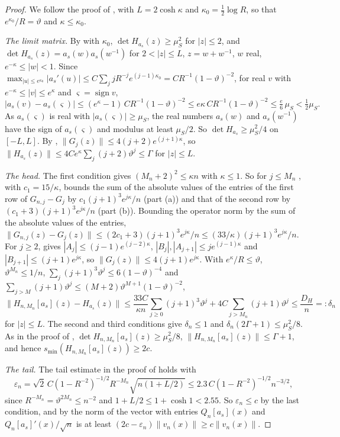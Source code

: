 \documentclass[11pt]{amsart}
\theoremstyle{definition}
\theoremstyle{remark}
\numberwithin{equation}{section}
\newcommand{\eps}{\varepsilon}
\begin{document}
\begin{proof}
We follow the proof of \cite[Proposition~\ref{M-prop:bulk}]{Main}, with $L=2\cosh\kappa$ and $\kappa_0=\frac12\log R$, so that $e^{\kappa_0}/R=\vartheta$ and $\kappa\le\kappa_0$.

\emph{The limit matrix.} By \cite[Lemma~\ref{M-lem:limit}]{Main} with $\kappa_0$, $\det H_{a_s}(z)\ge\mu_S^2$ for $|z|\le2$, and $\det H_{a_s}(z)=a_s(w)a_s(w^{-1})$ for $2<|z|\le L$, $z=w+w^{-1}$, $w$ real, $e^{-\kappa}\le|w|<1$. Since $\max_{|u|\le e^{\kappa_0}}|a_s'(u)|\le C\sum_jjR^{-j}e^{(j-1)\kappa_0}=CR^{-1}(1-\vartheta)^{-2}$, for real $v$ with $e^{-\kappa}\le|v|\le e^\kappa$ and $\varsigma=\operatorname{sign}v$,
\[
|a_s(v)-a_s(\varsigma)|\le(e^\kappa-1)\,CR^{-1}(1-\vartheta)^{-2}\le e\kappa\,CR^{-1}(1-\vartheta)^{-2}\le\tfrac e6\,\mu_S<\tfrac12\mu_S .
\]
As $a_s(\varsigma)$ is real with $|a_s(\varsigma)|\ge\mu_S$, the real numbers $a_s(w)$ and $a_s(w^{-1})$ have the sign of $a_s(\varsigma)$ and modulus at least $\mu_S/2$. So $\det H_{a_s}\ge\mu_S^2/4$ on $[-L,L]$. By \cite[Lemma~\ref{M-lem:transfer}]{Main}, $\|G_j(z)\|\le4(j+2)e^{(j+1)\kappa}$, so $\|H_{a_s}(z)\|\le4Ce^\kappa\sum_j(j+2)\vartheta^j\le\Gamma$ for $|z|\le L$.

\emph{The head.} The first condition gives $(M_n+2)^2\le\kappa n$ with $\kappa\le1$. So for $j\le M_n$ \cite[Lemma~\ref{M-lem:head-rate}]{Main}, with $c_1=15/\kappa$, bounds the sum of the absolute values of the entries of the first row of $G_{n,j}-G_j$ by $c_1(j+1)^3e^{j\kappa}/n$ (part (a)) and that of the second row by $(c_1+3)(j+1)^3e^{j\kappa}/n$ (part (b)). Bounding the operator norm by the sum of the absolute values of the entries, $\|G_{n,j}(z)-G_j(z)\|\le(2c_1+3)(j+1)^3e^{j\kappa}/n\le(33/\kappa)(j+1)^3e^{j\kappa}/n$. For $j\ge2$, \cite[Lemma~\ref{M-lem:chebyshev}]{Main} gives $|A_j|\le(j-1)e^{(j-2)\kappa}$, $|B_j|,|A_{j+1}|\le je^{(j-1)\kappa}$ and $|B_{j+1}|\le(j+1)e^{j\kappa}$, so $\|G_j(z)\|\le4(j+1)e^{j\kappa}$. With $e^\kappa/R\le\vartheta$, $\vartheta^{M_n}\le1/n$, $\sum_j(j+1)^3\vartheta^j\le6(1-\vartheta)^{-4}$ and $\sum_{j>M}(j+1)\vartheta^j\le(M+2)\vartheta^{M+1}(1-\vartheta)^{-2}$,
\[
\|H_{n,M_n}[a_s](z)-H_{a_s}(z)\|\le\frac{33C}{\kappa n}\sum_{j\ge0}(j+1)^3\vartheta^j+4C\sum_{j>M_n}(j+1)\vartheta^j\le\frac{D_H}n=:\delta_n
\]
for $|z|\le L$. The second and third conditions give $\delta_n\le1$ and $\delta_n(2\Gamma+1)\le\mu_S^2/8$. As in the proof of \cite[Proposition~\ref{M-prop:bulk}]{Main}, $\det H_{n,M_n}[a_s](z)\ge\mu_S^2/8$, $\|H_{n,M_n}[a_s](z)\|\le\Gamma+1$, and hence $s_{\min}(H_{n,M_n}[a_s](z))\ge2c$.

\emph{The tail.} The tail estimate in the proof of \cite[Proposition~\ref{M-prop:bulk}]{Main} holds with
\[
\eps_n=\sqrt2\,C(1-R^{-2})^{-1/2}R^{-M_n}\sqrt{n(1+L/2)}\le2.3\,C(1-R^{-2})^{-1/2}n^{-3/2},
\]
since $R^{-M_n}=\vartheta^{2M_n}\le n^{-2}$ and $1+L/2\le1+\cosh1<2.55$. So $\eps_n\le c$ by the last condition, and by \cite[\eqref{M-eq:head}]{Main} the norm of the vector with entries $Q_n[a_s](x)$ and $Q_n[a_s]'(x)/\sqrt n$ is at least $(2c-\eps_n)\|v_n(x)\|\ge c\|v_n(x)\|$.
\end{proof}
\end{document}
